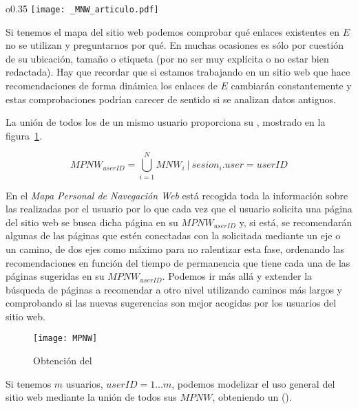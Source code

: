 \begin{wrapfigure}{o}{0.35\textwidth}
  \centering
  \texttt{[image: \_MNW\_articulo.pdf]}
	\caption{\MNW}
\label{fig:1-3-1-MNW}
\end{wrapfigure}
Si tenemos el mapa del sitio web podemos comprobar qué enlaces existentes en $E$ no se utilizan y preguntarnos por qué. En muchas ocasiones es sólo por cuestión de su ubicación, tamaño o etiqueta (por no ser muy explícita o no estar bien redactada). Hay que recordar que si estamos trabajando en un sitio web que hace recomendaciones de forma dinámica los enlaces de $E$ cambiarán constantemente y estas comprobaciones podrían carecer de sentido si se analizan datos antiguos.

La unión de todos los \mnws de un mismo usuario proporciona su \mpnw, mostrado en la figura~\ref{fig:1-3-1-MPNW}.

\begin{Definition}\label{def:1-3-1-MPNW}
  \begin{equation}
     \label{eq:1-MPNW}
     MPNW_{userID} = \bigcup_{i=1}^{N}{MNW_i}\ | \ {sesion}_i.user = userID 
  \end{equation}
\end{Definition}


En el \emph{Mapa Personal de Navegación Web} está recogida toda la información sobre las \sns realizadas por el usuario por lo que cada vez que el usuario solicita una página del sitio web se busca dicha página en su ${MPNW}_{userID}$ y, si está, se recomendarán algunas de las páginas que estén conectadas con la solicitada mediante un eje o un camino, de dos ejes como máximo para no ralentizar esta fase, ordenando las recomendaciones en función del tiempo de permanencia que tiene cada una de las páginas sugeridas en su ${MPNW}_{userID}$. Podemos ir más allá y extender la búsqueda de páginas a recomendar a otro nivel utilizando caminos más largos y comprobando si las nuevas sugerencias son mejor acogidas por los usuarios del sitio web.

\begin{figure}[htbp]
  \centering
  \texttt{[image: MPNW]}
  \caption{Obtención del \MPNW}
\label{fig:1-3-1-MPNW}
\end{figure}





Si tenemos $m$ usuarios, $userID = 1\ldots m$, podemos modelizar el uso general del sitio web mediante la unión de todos sus $MPNW$, obteniendo un \musw (\MUSW).

